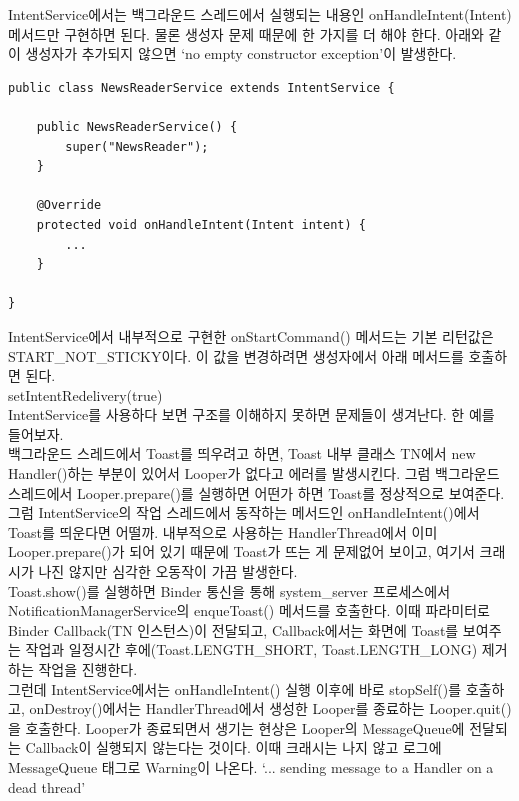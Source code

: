 IntentService에서는 백그라운드 스레드에서 실행되는 내용인 onHandleIntent(Intent) 메서드만 구현하면 된다.
물론 생성자 문제 때문에 한 가지를 더 해야 한다. 아래와 같이 생성자가 추가되지 않으면 `no empty constructor exception'이 발생한다. 
\begin{lstlisting}[frame=single]
public class NewsReaderService extends IntentService {

	public NewsReaderService() {
		super("NewsReader");
	}

	@Override
	protected void onHandleIntent(Intent intent) {
		...
	}
	
}	
\end{lstlisting}
IntentService에서 내부적으로 구현한 onStartCommand() 메서드는 기본 리턴값은 START\_NOT\_STICKY이다. 이 값을 변경하려면 생성자에서 아래 메서드를 호출하면 된다.\\ 

setIntentRedelivery(true)\\

IntentService를 사용하다 보면 구조를 이해하지 못하면 문제들이 생겨난다. 
한 예를 들어보자.\\

백그라운드 스레드에서 Toast를 띄우려고 하면, Toast 내부 클래스 TN에서 new Handler()하는 부분이 있어서 Looper가 없다고 에러를 발생시킨다. 그럼 백그라운드 스레드에서 Looper.prepare()를 실행하면 어떤가 하면 Toast를 정상적으로 보여준다.\\

그럼 IntentService의 작업 스레드에서 동작하는 메서드인 onHandleIntent()에서 Toast를 띄운다면 어떨까. 
내부적으로 사용하는 HandlerThread에서 이미 Looper.prepare()가 되어 있기 때문에 Toast가 뜨는 게 문제없어 보이고, 여기서 크래시가 나진 않지만 심각한 오동작이 가끔 발생한다.\\

Toast.show()를 실행하면 Binder 통신을 통해 system\_server 프로세스에서 NotificationManagerService의 enqueToast() 메서드를 호출한다. 이때 파라미터로 Binder Callback(TN 인스턴스)이 전달되고, Callback에서는 화면에 Toast를 보여주는 작업과 일정시간 후에(Toast.LENGTH\_SHORT, Toast.LENGTH\_LONG) 제거하는 작업을 진행한다.\\

그런데 IntentService에서는 onHandleIntent() 실행 이후에 바로 stopSelf()를 호출하고, onDestroy()에서는 HandlerThread에서 생성한 Looper를 종료하는 Looper.quit()을 호출한다. Looper가 종료되면서 생기는 현상은 Looper의 MessageQueue에 전달되는 Callback이 실행되지 않는다는 것이다.
이때 크래시는 나지 않고 로그에 MessageQueue 태그로 Warning이 나온다. `... sending message to a Handler on a dead thread'\\

